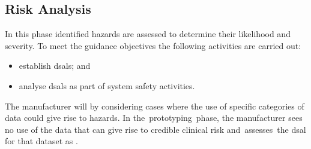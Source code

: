 \subsection{Risk Analysis}
\begin{minipage}[t]{0.73\textwidth}
  In this phase identified \glspl{hazard} are assessed to determine their likelihood and severity. To meet the guidance objectives the following activities are carried out:
  \begin{itemize}
    \item establish \glspl{dsal}; and
    \item analyse \glspl{dsal} as part of system safety activities.
  \end{itemize}
\end{minipage}
\begin{minipage}[t]{0.25\textwidth}
  \centering{}
\end{minipage}

The manufacturer will  by considering cases where the use of specific categories of data could give rise to \glspl{hazard}. In the\cbstart\ prototyping\cbend\ phase, the manufacturer sees no use of the data that can give rise to credible clinical risk and\cbstart\ assesses\cbend\ the \gls{dsal} for that \gls{dataset} as . 

